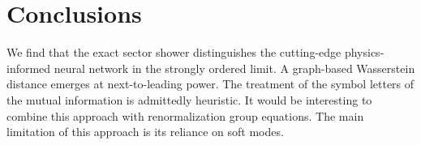 \section{Conclusions}\label{sec:conclusions}

We find that the exact sector shower distinguishes the cutting-edge
physics-informed neural network in the strongly ordered limit. A
graph-based Wasserstein distance emerges at next-to-leading power. The
treatment of the symbol letters of the mutual information is admittedly
heuristic. It would be interesting to combine this approach with
renormalization group equations. The main limitation of this approach is
its reliance on soft modes.

